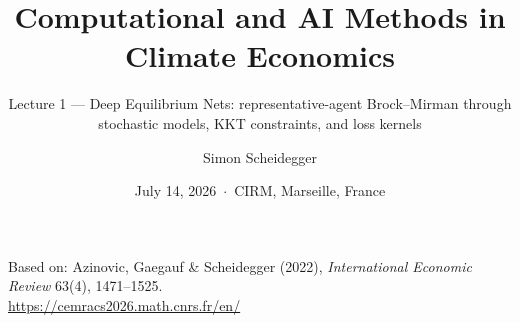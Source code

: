 \documentclass[aspectratio=169,11pt]{beamer}
\title[CEMRACS 2026 $\cdot$ DEQNs]
{Computational and AI Methods in Climate Economics}
\subtitle{Lecture 1 --- Deep Equilibrium Nets: representative-agent Brock--Mirman through stochastic models, KKT constraints, and loss kernels}
\author{Simon Scheidegger}
\institute{HEC Lausanne $\cdot$ Grantham Research Institute, LSE}
\date{July 14, 2026 \,$\cdot$\, CIRM, Marseille, France}
\begin{document}

{
\begin{frame}
\titlepage
\vspace{-0.4cm}
\begin{center}
{\footnotesize Based on: Azinovic, Gaegauf \& Scheidegger (2022), \emph{International Economic Review} 63(4), 1471--1525.}\\[8pt]
{\footnotesize \url{https://cemracs2026.math.cnrs.fr/en/}}
\end{center}
\end{frame}
}

\end{document}
